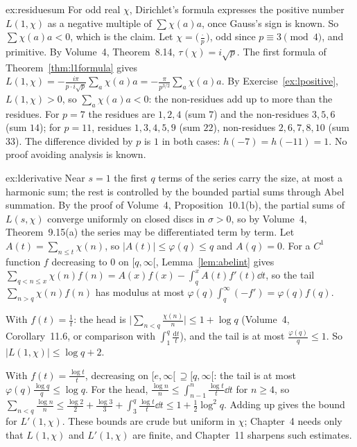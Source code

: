 \begin{solution}{ex:residuesum}
\idea For odd real $\chi$, Dirichlet's formula expresses the positive number $L(1,\chi)$ as a negative multiple of $\sum\chi(a)a$, once Gauss's sign is
known. So $\sum\chi(a)a<0$, which is the claim.
\writeup Let $\chi=\bigl(\frac\cdot p\bigr)$, odd since $p\equiv3\pmod4$, and primitive. By Volume~4, Theorem~8.14, $\tau(\chi)=i\sqrt p$. The first formula of Theorem~\ref{thm:l1formula}
gives $L(1,\chi)=-\frac{i\pi}{p\cdot i\sqrt p}\sum_a\chi(a)a=-\frac\pi{p^{3/2}}\sum_a\chi(a)a$. By Exercise~\ref{ex:lpositive}, $L(1,\chi)>0$, so $\sum_a\chi(a)a<0$: the non-residues add up to more
than the residues. For $p=7$ the residues are $1,2,4$ (sum $7$) and the non-residues $3,5,6$ (sum $14$); for $p=11$, residues $1,3,4,5,9$ (sum $22$),
non-residues $2,6,7,8,10$ (sum $33$). The difference divided by $p$ is $1$ in both cases: $h(-7)=h(-11)=1$. No proof avoiding analysis is known.
\end{solution}

\begin{solution}{ex:lderivative}
\idea Near $s=1$ the first $q$ terms of the series carry the size, at most a harmonic sum; the rest is controlled by the bounded partial sums
through Abel summation.
\writeup By the proof of Volume~4, Proposition~10.1(b), the partial sums of $L(s,\chi)$ converge uniformly on closed discs in $\sigma>0$, so by Volume~4,
Theorem~9.15(a) the series may be differentiated term by term. Let $A(t)=\sum_{n\le t}\chi(n)$, so $|A(t)|\le\varphi(q)\le q$ and $A(q)=0$. For a $C^1$ function $f$
decreasing to $0$ on $[q,\infty[$, Lemma~\ref{lem:abelint} gives $\sum_{q<n\le x}\chi(n)f(n)=A(x)f(x)-\int_q^xA(t)f'(t)\dd t$, so the tail $\sum_{n>q}\chi(n)f(n)$ has modulus at most
$\varphi(q)\int_q^\infty(-f')=\varphi(q)f(q)$.

With $f(t)=\frac1t$: the head is $\bigl|\sum_{n<q}\frac{\chi(n)}n\bigr|\le1+\log q$ (Volume~4, Corollary~11.6, or comparison with $\int_1^q\frac{\mathrm dt}t$), and the tail is at most
$\frac{\varphi(q)}q\le1$. So $|L(1,\chi)|\le\log q+2$.

With $f(t)=\frac{\log t}t$, decreasing on $[e,\infty[\,\supseteq[q,\infty[$: the tail is at most $\varphi(q)\frac{\log q}q\le\log q$. For the head, $\frac{\log n}n\le\int_{n-1}^n\frac{\log t}t\dd t$ for
$n\ge4$, so $\sum_{n<q}\frac{\log n}n\le\frac{\log2}2+\frac{\log3}3+\int_3^q\frac{\log t}t\dd t\le1+\frac12\log^2q$. Adding up gives the bound for $L'(1,\chi)$. These bounds are crude
but uniform in $\chi$; Chapter~4 needs only that $L(1,\chi)$ and $L'(1,\chi)$ are finite, and Chapter~11 sharpens such estimates.
\end{solution}

